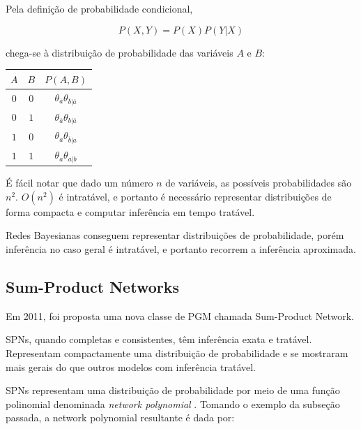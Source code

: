 \documentclass[a4paper,10pt]{article}
\theoremstyle{plain}
\begin{document}
Pela definição de probabilidade condicional,

\begin{equation*}
  P(X, Y) = P(X)P(Y|X)
\end{equation*}

chega-se à distribuição de probabilidade das variáveis $A$ e $B$:

\begin{table}[h]
  \begin{center}
    \begin{tabular}{c c | c}
      $A$ & $B$ & $P(A, B)$ \\
      \hline
      $0$ & $0$ & $\theta_{\overline{a}}\theta_{\overline{b}|\overline{a}}$ \\
      $0$ & $1$ & $\theta_{\overline{a}}\theta_{b|\overline{a}}$ \\
      $1$ & $0$ & $\theta_a\theta_{\overline{b}|a}$ \\
      $1$ & $1$ & $\theta_a\theta_{a|b}$ \\
    \end{tabular}
  \end{center}
\end{table}

É fácil notar que dado um número $n$ de variáveis, as possíveis probabilidades são $n^2$. $O(n^2)$
é intratável, e portanto é necessário representar distribuições de forma compacta e computar
inferência em tempo tratável.

Redes Bayesianas conseguem representar distribuições de probabilidade, porém inferência no caso
geral é intratável, e portanto recorrem a inferência aproximada.

\subsection{Sum-Product Networks}

Em 2011, foi proposta\cite{poon-domingos} uma nova classe de PGM chamada Sum-Product Network.

SPNs, quando completas e consistentes, têm inferência exata e tratável. Representam compactamente
uma distribuição de probabilidade e se mostraram mais gerais do que outros modelos com inferência
tratável.

SPNs representam uma distribuição de probabilidade por meio de uma função polinomial denominada
\textit{network polynomial} \cite{bayes-net-darwiche, poon-domingos}. Tomando o exemplo da
subseção passada, a network polynomial resultante é dada por:
\end{document}
